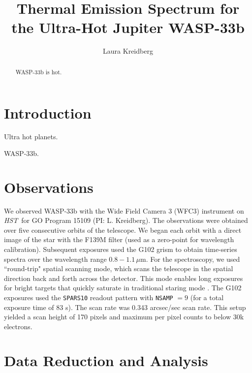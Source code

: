 \documentclass[twocolumn]{aastex62}
\newcommand{\project}[1]{\textsl{#1}}
\newcommand{\HST}{\project{HST}}
\begin{document}
\title{Thermal Emission Spectrum for the Ultra-Hot Jupiter WASP-33b }

\author{Laura Kreidberg}

\begin{abstract}
WASP-33b is hot.
\end{abstract}


\section{Introduction} \label{sec:intro}
Ultra hot planets.

WASP-33b.

\section{Observations} \label{sec:observations}
We observed WASP-33b with the Wide Field Camera 3 (WFC3) instrument on \HST\ for GO Program 15109 (PI: L. Kreidberg). The observations were obtained over five consecutive orbits of the telescope. We began each orbit with a direct image of the star with the F139M filter (used as a zero-point for wavelength calibration). Subsequent exposures used the G102 grism to obtain time-series spectra over the wavelength range $0.8 - 1.1\,\mu$m. For the spectroscopy, we used ``round-trip" spatial scanning mode, which scans the telescope in the spatial direction back and forth across the detector. This mode enables long exposures for bright targets that quickly saturate in traditional staring mode \citep[compare][]{berta12, kreidberg14a}.  The G102 exposures used the \texttt{SPARS10} readout pattern with \texttt{NSAMP} $= 9$ (for a total exposure time of 83 s). The scan rate was 0.343 arcsec/sec scan rate. This setup yielded a scan height of 170 pixels and maximum per pixel counts to below 30k electrons. 

\section{Data Reduction and Analysis} \label{sec:reduction}
\end{document}
